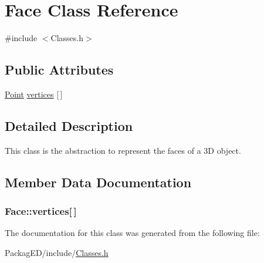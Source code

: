 \hypertarget{class_face}{}\section{Face Class Reference}
\label{class_face}


{\ttfamily \#include $<$Classes.\+h$>$}

\subsection*{Public Attributes}
\begin{DoxyCompactItemize}
\item 
\hyperlink{class_point}{Point} \hyperlink{class_face_acb5b50d81748e6dcbab0a533b336f534}{vertices} \mbox{[}$\,$\mbox{]}
\end{DoxyCompactItemize}


\subsection{Detailed Description}
This class is the abstraction to represent the faces of a 3D object. 

\subsection{Member Data Documentation}
\subsubsection[{\texorpdfstring{vertices}{vertices}}]{ Face\+::vertices\mbox{[}$\,$\mbox{]}}\hypertarget{class_face_acb5b50d81748e6dcbab0a533b336f534}{}\label{class_face_acb5b50d81748e6dcbab0a533b336f534}


The documentation for this class was generated from the following file\+:\begin{DoxyCompactItemize}
\item 
Packag\+E\+D/include/\hyperlink{_classes_8h}{Classes.\+h}\end{DoxyCompactItemize}

